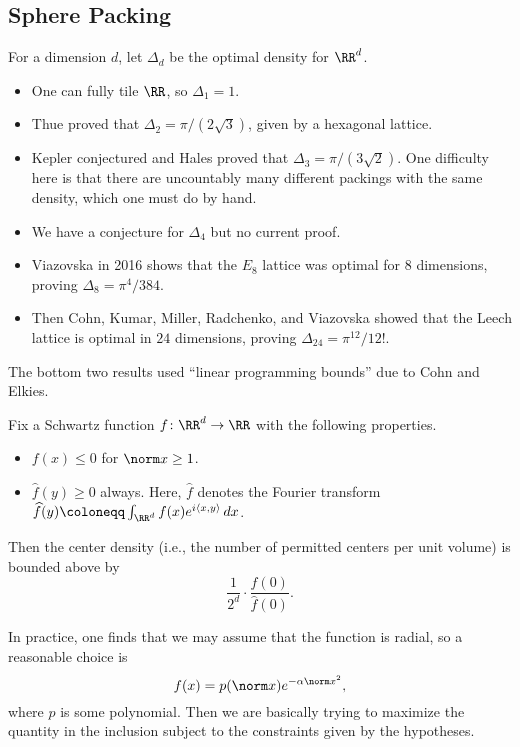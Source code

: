 \documentclass{article}
\begin{document}
\subsection{Sphere Packing}
For a dimension $d$, let $\Delta_d$ be the optimal density for $\RR^d$.
\begin{itemize}
	\item One can fully tile $\RR$, so $\Delta_1=1$.
	\item Thue proved that $\Delta_2=\pi/(2\sqrt3)$, given by a hexagonal lattice.
	\item Kepler conjectured and Hales proved that $\Delta_3=\pi/(3\sqrt2)$. One difficulty here is that there are uncountably many different packings with the same density, which one must do by hand.
	\item We have a conjecture for $\Delta_4$ but no current proof.
	\item Viazovska in 2016 shows that the $E_8$ lattice was optimal for $8$ dimensions, proving $\Delta_8=\pi^4/384$.
	\item Then Cohn, Kumar, Miller, Radchenko, and Viazovska showed that the Leech lattice is optimal in $24$ dimensions, proving $\Delta_{24}=\pi^{12}/12!$.
\end{itemize}
The bottom two results used ``linear programming bounds'' due to Cohn and Elkies.
\begin{theorem}
	Fix a Schwartz function $f\colon\RR^d\to\RR$ with the following properties.
	\begin{itemize}
		\item $f(x)\le0$ for $\norm x\ge1$.
		\item $\widehat f(y)\ge0$ always. Here, $\widehat f$ denotes the Fourier transform $\widehat f(y)\coloneqq\int_{\RR^d}f(x)e^{i\langle x,y\rangle}\,dx$.
	\end{itemize}
	Then the center density (i.e., the number of permitted centers per unit volume) is bounded above by
	\[\frac1{2^d}\cdot\frac{f(0)}{\widehat f(0)}.\]
\end{theorem}
In practice, one finds that we may assume that the function is radial, so a reasonable choice is
\[f(x)=p(\norm x)e^{-\alpha\norm x^2},\]
where $p$ is some polynomial. Then we are basically trying to maximize the quantity in the inclusion subject to the constraints given by the hypotheses.
\end{document}
